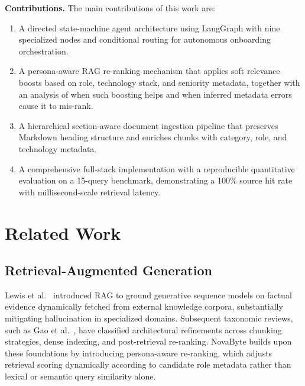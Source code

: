 \documentclass[conference]{IEEEtran}
\begin{document}
\smallskip
\noindent\textbf{Contributions.} The main contributions of this work are:
\begin{enumerate}
    \item A directed state-machine agent architecture using LangGraph with nine specialized nodes and conditional routing for autonomous onboarding orchestration.
    \item A persona-aware RAG re-ranking mechanism that applies soft relevance boosts based on role, technology stack, and seniority metadata, together with an analysis of when such boosting helps and when inferred metadata errors cause it to mis-rank.
    \item A hierarchical section-aware document ingestion pipeline that preserves Markdown heading structure and enriches chunks with category, role, and technology metadata.
    \item A comprehensive full-stack implementation with a reproducible quantitative evaluation on a 15-query benchmark, demonstrating a 100\% source hit rate with millisecond-scale retrieval latency.
\end{enumerate}

\section{Related Work}

\subsection{Retrieval-Augmented Generation}
Lewis et al.~\cite{lewis2020rag} introduced RAG to ground generative sequence models on factual evidence dynamically fetched from external knowledge corpora, substantially mitigating hallucination in specialized domains. Subsequent taxonomic reviews, such as Gao et al.~\cite{gao2023retrieval}, have classified architectural refinements across chunking strategies, dense indexing, and post-retrieval re-ranking. NovaByte builds upon these foundations by introducing persona-aware re-ranking, which adjusts retrieval scoring dynamically according to candidate role metadata rather than lexical or semantic query similarity alone.
\end{document}
